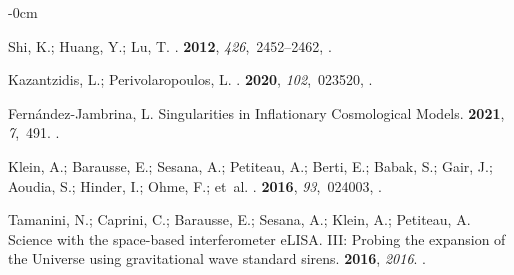 \documentclass[universe,article,accept,moreauthors,pdftex]{Definitions/mdpi}
\begin{document}
\begin{adjustwidth}{-\extralength}{0cm}
\begin{thebibliography}{999}
Shi, K.; Huang, Y.; Lu, T.
.
 {\bf 2012}, {\em 426},~2452--2462,
{\href{https://doi.org/10.1111/j.1365-2966.2012.21784.x}{}}.

Kazantzidis, L.; Perivolaropoulos, L.
.
 {\bf 2020}, {\em 102},~023520,
{\href{https://doi.org/10.1103/PhysRevD.102.023520}{}}.

Fern{\'{a}}ndez-Jambrina, L.
\newblock Singularities in Inflationary Cosmological Models.
 {\bf 2021}, {\em 7},~491.
\newblock
{\href{https://doi.org/10.3390/universe7120491}{}}.



Klein, A.; Barausse, E.; Sesana, A.; Petiteau, A.; Berti, E.; Babak, S.; Gair, J.; Aoudia, S.; Hinder, I.; Ohme, F.;  et~al.
.
 {\bf 2016}, {\em 93},~024003,
{\href{https://doi.org/10.1103/PhysRevD.93.024003}{}}.

Tamanini, N.; Caprini, C.; Barausse, E.; Sesana, A.; Klein, A.; Petiteau, A.
\newblock Science with the space-based interferometer eLISA. III: Probing the
  expansion of the Universe using gravitational wave standard sirens.
 {\bf 2016}, {\em
  2016}.
\newblock
{\href{https://doi.org/10.1088/1475-7516/2016/04/002}{}}.


\end{thebibliography}
\end{adjustwidth}
\end{document}
